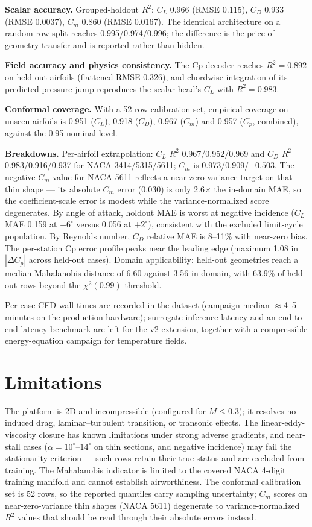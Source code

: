 \documentclass[11pt]{article}
\begin{document}
\textbf{Scalar accuracy.} Grouped-holdout $R^2$: $C_L$ 0.966 (RMSE 0.115),
$C_D$ 0.933 (RMSE 0.0037), $C_m$ 0.860 (RMSE 0.0167). The identical
architecture on a random-row split reaches 0.995/0.974/0.996; the difference
is the price of geometry transfer and is reported rather than hidden.

\textbf{Field accuracy and physics consistency.} The Cp decoder reaches
$R^2 = 0.892$ on held-out airfoils (flattened RMSE 0.326), and chordwise
integration of its predicted pressure jump reproduces the scalar head's
$C_L$ with $R^2 = 0.983$.

\textbf{Conformal coverage.} With a 52-row calibration set, empirical
coverage on unseen airfoils is 0.951 ($C_L$), 0.918 ($C_D$), 0.967 ($C_m$)
and 0.957 ($C_p$, combined), against the 0.95 nominal level.

\textbf{Breakdowns.} Per-airfoil extrapolation: $C_L$ $R^2$ 0.967/0.952/0.969
and $C_D$ $R^2$ 0.983/0.916/0.937 for NACA 3414/5315/5611; $C_m$ is
0.973/0.909/$-0.503$. The negative $C_m$ value for NACA 5611 reflects a
near-zero-variance target on that thin shape --- its absolute $C_m$ error
(0.030) is only 2.6$\times$ the in-domain MAE, so the coefficient-scale
error is modest while the variance-normalized score degenerates.
By angle of attack, holdout MAE is worst at negative incidence
($C_L$ MAE 0.159 at $-6^\circ$ versus 0.056 at $+2^\circ$), consistent
with the excluded limit-cycle population. By Reynolds number, $C_D$
relative MAE is 8--11\% with near-zero bias. The per-station Cp error
profile peaks near the leading edge (maximum 1.08 in $|\Delta C_p|$
across held-out cases). Domain applicability: held-out geometries reach a
median Mahalanobis distance of 6.60 against 3.56 in-domain, with 63.9\% of
held-out rows beyond the $\chi^2(0.99)$ threshold.

Per-case CFD wall times are recorded in the dataset (campaign median
$\approx$4--5 minutes on the production hardware); surrogate inference latency
and an end-to-end latency benchmark are left for the v2 extension, together
with a compressible energy-equation campaign for temperature fields.

\section{Limitations}
\label{sec:limits}

The platform is 2D and incompressible (configured for $M\le0.3$); it resolves no
induced drag, laminar--turbulent transition, or transonic effects. The
linear-eddy-viscosity closure has known limitations under strong adverse
gradients, and near-stall cases ($\alpha = 10^\circ$--$14^\circ$ on thin
sections, and negative incidence) may fail the stationarity criterion ---
such rows retain their true status and are excluded from training. The
Mahalanobis indicator is limited to the covered NACA 4-digit training
manifold and cannot establish airworthiness. The conformal calibration set
is 52 rows, so the reported quantiles carry sampling uncertainty; $C_m$
scores on near-zero-variance thin shapes (NACA 5611) degenerate to
variance-normalized $R^2$ values that should be read through their absolute
errors instead.
\end{document}

